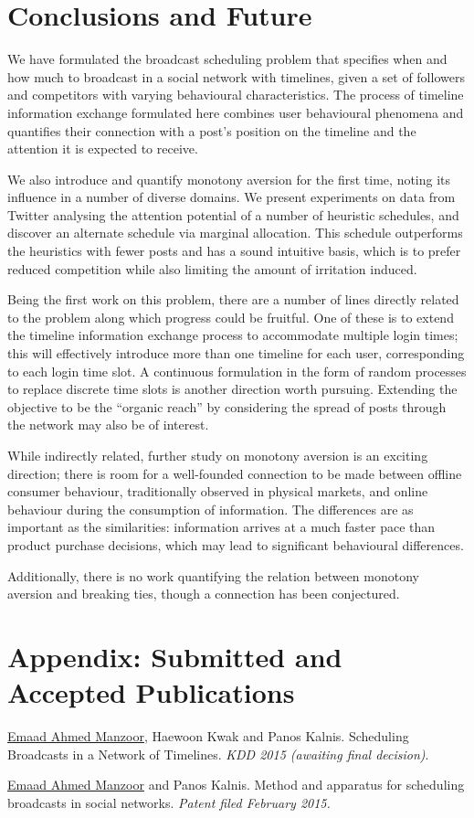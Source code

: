 \documentclass[onesided,asymmetric]{tufte-book}
\begin{document}
\chapter{Conclusions and Future}

We have formulated the broadcast scheduling problem that specifies when and how much to broadcast in a social network with timelines, given a set of followers and competitors with varying behavioural characteristics. The process of timeline information exchange formulated here combines user behavioural phenomena and quantifies their connection with a post's position on the timeline and the attention it is expected to receive.

We also introduce and quantify monotony aversion for the first time, noting its influence in a number of diverse domains. We present experiments on data from Twitter analysing the attention potential of a number of heuristic schedules, and discover an alternate schedule via marginal allocation. This schedule outperforms the heuristics with fewer posts and has a sound intuitive basis, which is to prefer reduced competition while also limiting the amount of irritation induced.

Being the first work on this problem, there are a number of lines directly related to the problem along which progress could be fruitful. One of these is to extend the timeline information exchange process to accommodate multiple login times; this will effectively introduce more than one timeline for each user, corresponding to each login time slot. A continuous formulation in the form of random processes to replace discrete time slots is another direction worth pursuing. Extending the objective to be the ``organic reach'' by considering the spread of posts through the network may also be of interest.

While indirectly related, further study on monotony aversion is an exciting direction; there is room for a well-founded connection to be made between offline consumer behaviour, traditionally observed in physical markets, and online behaviour during the consumption of information. The differences are as important as the similarities: information arrives at a much faster pace than product purchase decisions, which may lead to significant behavioural differences.

Additionally, there is no work quantifying the relation between monotony aversion and breaking ties, though a connection has been conjectured\cite{kwak2011fragile}.

\backmatter

\chapter{Appendix: Submitted and Accepted Publications}

\underline{Emaad Ahmed Manzoor}, Haewoon Kwak and Panos Kalnis. Scheduling Broadcasts in a Network of Timelines. \textit{KDD 2015 (awaiting final decision)}.

\underline{Emaad Ahmed Manzoor} and Panos Kalnis. Method and apparatus for scheduling broadcasts in social networks. \textit{Patent filed February 2015.}




\printindex
\end{document}
